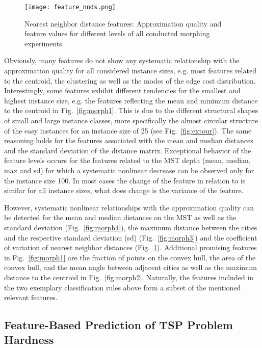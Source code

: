 \documentclass{article}
\begin{document}
\begin{figure}
  \centering
  \texttt{[image: feature\_nnds.png]}
  \caption{Nearest  neighbor distance features:  Approximation quality
    and feature values for  different  levels of all conducted
    morphing experiments.}
  \label{fig:morph5}
\end{figure}

Obviously, many features do not show any systematic relationship with
the approximation quality for all considered instance sizes, e.g. most
features related to the centroid, the clustering as well as the modes
of the edge cost distribution. Interestingly, some features exhibit
different tendencies for the smallest and highest instance size,
e.g. the features reflecting the mean and minimum distance to the
centroid in Fig.~\ref{fig:morph1}. This is due to the different
structural shapes of small and large instance classes, more
specifically the almost circular structure of the easy instances for
an instance size of 25 (see Fig.~\ref{fig:extour}). The same reasoning
holds for the features associated with the mean and median distances
and the standard deviation of the distance matrix. Exceptional
behavior of the feature levels occurs for the features related to the
MST depth (mean, median, max and sd) for which a systematic nonlinear
decrease can be observed only for the instance size 100.  In
most cases the change of the feature in relation to  is
similar for all instance sizes, what does change is the variance of
the feature.

However, systematic nonlinear relationships with the approximation
quality can be detected for the mean and median distances on the MST
as well as the standard deviation (Fig.~\ref{fig:morph4}), the maximum
distance between the cities and the respective standard deviation (sd)
(Fig.~\ref{fig:morph3}) and the coefficient of variation of nearest
neighbor distances (Fig.~\ref{fig:morph5}). Additional promising
features in Fig.~\ref{fig:morph1} are the fraction of points on the
convex hull, the area of the convex hull, and the mean angle between
adjacent cities as well as the maximum distance to the centroid in
Fig.~\ref{fig:morph2}. Naturally, the features included in the two
exemplary classification rules above form a subset of the mentioned
relevant features.

\subsection{Feature-Based Prediction of TSP
  Problem Hardness}
\label{sec:MARS}
\end{document}
